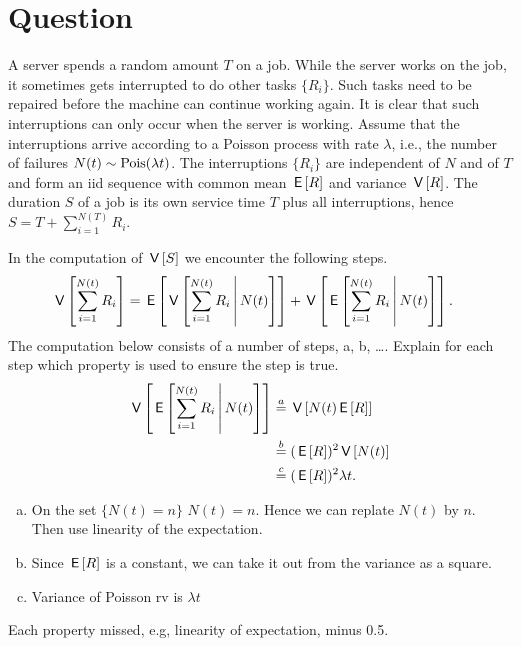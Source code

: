 \section*{Question}


A server  spends a random amount $T$ on a job.
While the server works on the job, it sometimes gets interrupted to do other tasks $\{R_{i}\}$.
Such tasks need to be repaired before the machine can continue working again.
It is clear that such interruptions can only occur when the server is working.
Assume that the interruptions arrive according to a Poisson process with rate $\lambda$, i.e., the number of failures $N(t) \sim\mathrm{Pois}(\lambda t)$.
The interruptions $\{R_{i}\}$ are independent of $N$ and of $T$ and form an iid sequence with common mean $\,\mathsf{E}\left[R\right]$ and variance $\,\mathsf{V}\left[R\right]$.
The  duration $S$ of a job  is its own service time $T$ plus all interruptions, hence $S = T+ \sum_{i=1}^{N(T)} R_{i}$.

\begin{exercise}[1.5]
In the computation of $\,\mathsf{V}\left[S\right]$ we encounter the following steps.
\begin{align}
\,\mathsf{V}\left[\sum_{i=1}^{N(t)} R_{i}\right] &= \,\mathsf{E}\left[\,\mathsf{V}\left[\sum_{i=1}^{N(t)} R_{i}\,\middle|\, N(t)\right]\right] + \,\mathsf{V}\left[\,\mathsf{E}\left[\sum_{i=1}^{N(t)} R_{i}\,\middle|\, N(t)\right]\right].
\end{align}
The computation below consists of a number of steps, a, b, \ldots. Explain for each step which property is used to ensure the step is true.
\begin{align}
\,\mathsf{V}\left[\,\mathsf{E}\left[\sum_{i=1}^{N(t)} R_{i}\,\middle|\, N(t)\right]\right]
  &\stackrel{a}{=} \,\mathsf{V}\left[N(t)\,\mathsf{E}\left[R\right]\right] \\
  &\stackrel{b}{=} (\,\mathsf{E}\left[R\right])^{2} \,\mathsf{V}\left[N(t)\right] \\
  &\stackrel{c}{=} (\,\mathsf{E}\left[R\right])^{2} \lambda t.
\end{align}
\begin{solution}
  \begin{enumerate}[a.]
  \item  On the set $\{N(t)=n\}$ $N(t)=n$. Hence we can replate  $N(t)$ by $n$. Then use linearity of the expectation.
  \item  Since $\,\mathsf{E}\left[R\right]$ is a constant, we can take it out from the variance as a square.
   \item  Variance of Poisson rv is $\lambda t$
  \end{enumerate}
Each  property missed, e.g, linearity of expectation, minus 0.5.
\end{solution}
\end{exercise}




